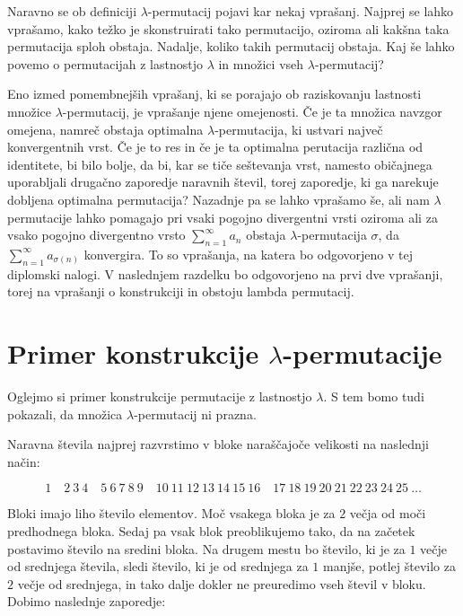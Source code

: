 \documentclass[12pt,a4paper,reqno]{amsart}
\theoremstyle{definition} %
\theoremstyle{plain} %
\begin{document}
Naravno se ob definiciji $\lambda$-permutacij pojavi kar nekaj vprašanj. Najprej se lahko vprašamo, kako težko je skonstruirati tako permutacijo, oziroma ali kakšna taka permutacija sploh obstaja. Nadalje, koliko takih permutacij obstaja. Kaj še lahko povemo o permutacijah z lastnostjo $\lambda$ in množici vseh $\lambda$-permutacij? 

Eno izmed pomembnejših vprašanj, ki se porajajo ob raziskovanju lastnosti množice $\lambda$-permutacij, je vprašanje njene omejenosti. Če je ta množica navzgor omejena, namreč obstaja optimalna $\lambda$-permutacija, ki ustvari največ konvergentnih vrst. Če je to res in če je ta optimalna perutacija različna od identitete, bi bilo bolje, da bi, kar se tiče seštevanja vrst, namesto običajnega uporabljali drugačno zaporedje naravnih števil, torej zaporedje, ki ga narekuje dobljena optimalna permutacija? Nazadnje pa se lahko vprašamo še, ali nam $\lambda$ permutacije lahko pomagajo pri vsaki pogojno divergentni vrsti oziroma ali za vsako pogojno divergentno vrsto $\sum^{\infty}_{n=1}a_n$ obstaja $\lambda$-permutacija $\sigma$, da $\sum^{\infty}_{n=1}a_{\sigma (n)}$ konvergira. To so vprašanja, na katera bo odgovorjeno v tej diplomski nalogi.
V naslednjem razdelku bo odgovorjeno na prvi dve vprašanji, torej na vprašanji o konstrukciji in obstoju lambda permutacij.

\section{Primer konstrukcije $\lambda$-permutacije} \label{sec:konstrukcija}

Oglejmo si primer konstrukcije permutacije z lastnostjo $\lambda$. S tem bomo tudi pokazali, da množica $\lambda$-permutacij ni prazna.

Naravna števila najprej razvrstimo v bloke naraščajoče velikosti na naslednji način:

\begin{equation}
1 \quad 2\: 3\: 4 \quad 5\: 6\: 7\: 8\: 9 \quad 10\: 11\: 12\: 13\: 14\: 15\: 16 \quad 17\: 18\: 19\: 20\: 21\: 22\: 23\: 24\: 25\: \ldots 
\label{eq:1}
\end{equation}

Bloki imajo liho število elementov. Moč vsakega bloka je za $2$ večja od moči predhodnega bloka. Sedaj pa vsak blok preoblikujemo tako, da na začetek postavimo število na sredini bloka. Na drugem mestu bo število, ki je za $1$ večje od srednjega števila, sledi število, ki je od srednjega za $1$ manjše, potlej število za $2$ večje od srednjega, in tako dalje dokler ne preuredimo vseh števil v bloku. Dobimo naslednje zaporedje:
\end{document}
